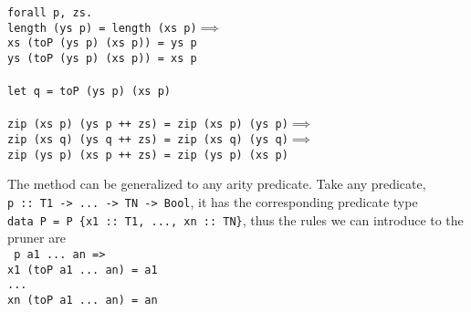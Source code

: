 \texttt{forall p, zs.}\\
\texttt{length (ys p) = length (xs p)}$\implies$\\
\texttt{xs (toP (ys p) (xs p)) = ys p}\\
\texttt{ys (toP (ys p) (xs p)) = xs p}\\\\
\texttt{let q = toP (ys p) (xs p)}\\\\
\texttt{zip (xs p) (ys p ++ zs) = zip (xs p) (ys p)}$\implies$\\
\texttt{zip (xs q) (ys q ++ zs) = zip (xs q) (ys q)}$\implies$\\
\texttt{zip (ys p) (xs p ++ zs) = zip (ys p) (xs p)}

The method can be generalized to any arity predicate.
Take any predicate,\\\texttt{p :: T1 -> ... -> TN -> Bool},
it has the corresponding predicate type
\\\texttt{data P = P \{x1 :: T1, ..., xn :: TN\}},
thus the rules we can introduce to the pruner are
\\\texttt{
p a1 ... an =>\\
x1 (toP a1 ... an) = a1\\
...\\
xn (toP a1 ... an) = an\\
}
